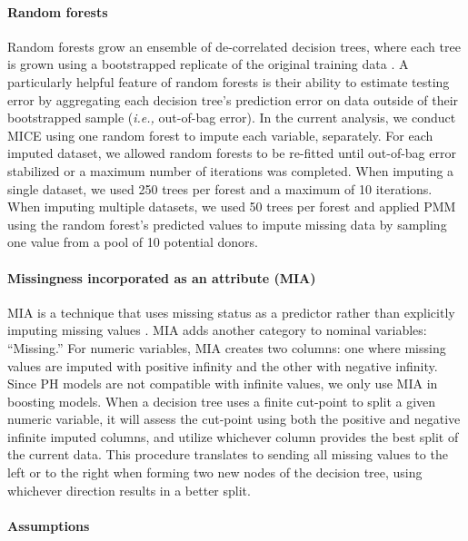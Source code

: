\documentclass{article}
\begin{document}
\paragraph{Random forests}

Random forests grow an ensemble of de-correlated decision trees, where
each tree is grown using a bootstrapped replicate of the original
training data
\cite{Breiman2001, hothorn2006survival, strobl2007bias, strobl2008conditional, ishwaran2008random, jaeger2019oblique}.
A particularly helpful feature of random forests is their ability to
estimate testing error by aggregating each decision tree's prediction
error on data outside of their bootstrapped sample
(\textit{i.e., } out-of-bag error). In the current analysis, we conduct
MICE using one random forest to impute each variable, separately. For
each imputed dataset, we allowed random forests to be re-fitted until
out-of-bag error stabilized or a maximum number of iterations was
completed. When imputing a single dataset, we used 250 trees per forest
and a maximum of 10 iterations. When imputing multiple datasets, we used
50 trees per forest and applied PMM using the random forest's predicted
values to impute missing data by sampling one value from a pool of 10
potential donors.

\paragraph{Missingness incorporated as an attribute (MIA)}

MIA is a technique that uses missing status as a predictor rather than
explicitly imputing missing values
\cite{twala2009empirical, ding2010investigation}. MIA adds another
category to nominal variables: ``Missing.'' For numeric variables, MIA
creates two columns: one where missing values are imputed with positive
infinity and the other with negative infinity. Since PH models are not
compatible with infinite values, we only use MIA in boosting models.
When a decision tree uses a finite cut-point to split a given numeric
variable, it will assess the cut-point using both the positive and
negative infinite imputed columns, and utilize whichever column provides
the best split of the current data. This procedure translates to sending
all missing values to the left or to the right when forming two new
nodes of the decision tree, using whichever direction results in a
better split.

\paragraph{Assumptions}
\end{document}
